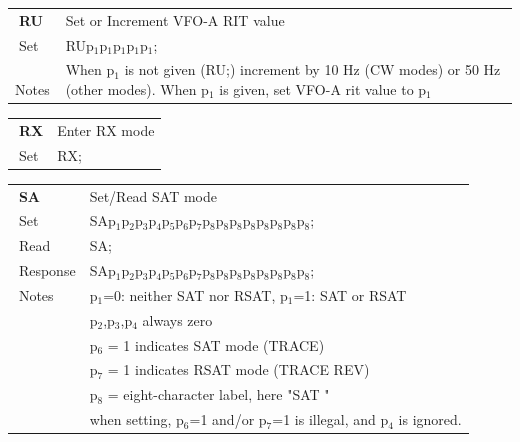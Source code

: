 \documentclass[12pt]{book}
\begin{document}
\begin{center}
\begin{tabular}{|p{2cm}|p{11cm}|}
\toprule
$\phantom{\Big|}$\textbf{\large RU} & Set or Increment VFO-A RIT value \\\cline{1-2}
$\phantom{\Big|}${\large Set} & {RUp$_1$p$_1$p$_1$p$_1$p$_1$;} \\\hline
$\phantom{\Big|}${\large Notes} & \multicolumn{1}{|p{11cm}|}{When p$_1$ is not given (RU;)  increment by 10 Hz (CW modes) or 50 Hz (other modes). When p$_1$ is given, set VFO-A rit value to p$_1$} \\
\bottomrule
\end{tabular}
\end{center}

\begin{center}
\begin{tabular}{|p{2cm}|p{11cm}|}
\toprule
$\phantom{\Big|}$\textbf{\large RX} & Enter RX mode \\\cline{1-2}
$\phantom{\Big|}${\large Set} & {RX;} \\\hline
\bottomrule
\end{tabular}
\end{center}

\begin{center}
\begin{tabular}{|p{2cm}|p{11cm}|}
\toprule
$\phantom{\Big|}$\textbf{\large SA} & Set/Read SAT mode \\\cline{1-2}
$\phantom{\Big|}${\large Set} & {SAp$_1$p$_2$p$_3$p$_4$p$_5$p$_6$p$_7$p$_8$p$_8$p$_8$p$_8$p$_8$p$_8$p$_8$p$_8$;} \\\hline
$\phantom{\Big|}${\large Read} & {SA;} \\\hline
$\phantom{\Big|}${\large Response} & {SAp$_1$p$_2$p$_3$p$_4$p$_5$p$_6$p$_7$p$_8$p$_8$p$_8$p$_8$p$_8$p$_8$p$_8$p$_8$;} \\\hline
$\phantom{\Big|}${\large Notes} & \multicolumn{1}{|p{11cm}|}{p$_1$=0: neither SAT nor RSAT, p$_1$=1: SAT or RSAT} \\
 & \multicolumn{1}{|p{11cm}|}{p$_2$,p$_3$,p$_4$ always zero} \\
 & \multicolumn{1}{|p{11cm}|}{p$_6$ = 1 indicates SAT mode (TRACE)} \\
 & \multicolumn{1}{|p{11cm}|}{p$_7$ = 1 indicates RSAT mode (TRACE REV)} \\
 & \multicolumn{1}{|p{11cm}|}{p$_8$ = eight-character label, here "SAT     "} \\
 & \multicolumn{1}{|p{11cm}|}{when setting, p$_6$=1 and/or p$_7$=1 is illegal, and p$_4$ is ignored.} \\
\bottomrule
\end{tabular}
\end{center}
\end{document}
